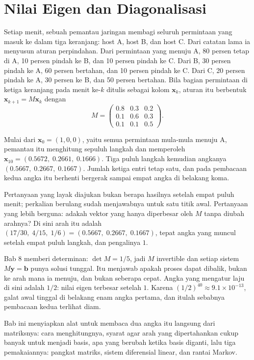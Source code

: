 \chapter{Nilai Eigen dan Diagonalisasi}

Setiap menit, sebuah pemantau jaringan membagi seluruh permintaan yang masuk ke dalam tiga
keranjang: host A, host B, dan host C. Dari catatan lama ia menyusun aturan perpindahan. Dari
permintaan yang menuju A, 80 persen tetap di A, 10 persen pindah ke B, dan 10 persen pindah ke C.
Dari B, 30 persen pindah ke A, 60 persen bertahan, dan 10 persen pindah ke C. Dari C, 20 persen
pindah ke A, 30 persen ke B, dan 50 persen bertahan. Bila bagian permintaan di ketiga keranjang
pada menit ke-$k$ ditulis sebagai kolom $\mathbf{x}_{k}$, aturan itu berbentuk
$\mathbf{x}_{k+1}=M\mathbf{x}_{k}$ dengan
\[
  M=\begin{pmatrix}0.8&0.3&0.2\\ 0.1&0.6&0.3\\ 0.1&0.1&0.5\end{pmatrix}.
\]

Mulai dari $\mathbf{x}_{0}=(1,0,0)$, yaitu semua permintaan mula-mula menuju A, pemantau itu
menghitung sepuluh langkah dan memperoleh
$\mathbf{x}_{10}=(0.5672,\;0.2661,\;0.1666)$. Tiga puluh langkah kemudian angkanya
$(0.5667,\;0.2667,\;0.1667)$. Jumlah ketiga entri tetap satu, dan pada pembacaan kedua angka itu
berhenti bergerak sampai empat angka di belakang koma.

Pertanyaan yang layak diajukan bukan berapa hasilnya setelah empat puluh menit; perkalian berulang
sudah menjawabnya untuk satu titik awal. Pertanyaan yang lebih berguna: adakah vektor yang hanya
diperbesar oleh $M$ tanpa diubah arahnya? Di sini arah itu adalah
$(17/30,\;4/15,\;1/6)=(0.5667,\;0.2667,\;0.1667)$, tepat angka yang muncul setelah empat puluh
langkah, dan pengalinya $1$.

Bab 8 memberi determinan: $\det M=1/5$, jadi $M$ invertible dan setiap sistem $M\mathbf{y}=
\mathbf{b}$ punya solusi tunggal. Itu menjawab apakah proses dapat dibalik, bukan ke arah mana ia
menuju, dan bukan seberapa cepat. Angka yang mengatur laju di sini adalah $1/2$: nilai eigen
terbesar setelah $1$. Karena $(1/2)^{40}\approx9.1\times10^{-13}$, galat awal tinggal di belakang
enam angka pertama, dan itulah sebabnya pembacaan kedua terlihat diam.

Bab ini menyiapkan alat untuk membaca dua angka itu langsung dari matriksnya: cara menghitungnya,
syarat agar arah yang dipertahankan cukup banyak untuk menjadi basis, apa yang berubah ketika
basis diganti, lalu tiga pemakaiannya: pangkat matriks, sistem diferensial linear, dan rantai
Markov.

